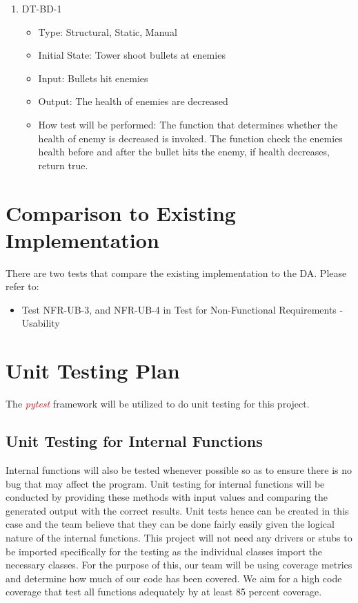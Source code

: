 \documentclass[12,english]{article}
\begin{document}
\begin{enumerate}
    \item DT-BD-1
    \begin{itemize}
        \item Type: Structural, Static, Manual
        \item Initial State: Tower shoot bullets at enemies
        \item Input: Bullets hit enemies
        \item Output: The health of enemies are decreased
        \item How test will be performed: The function that determines whether the health of enemy is decreased is invoked. The function check the enemies health before and after the bullet hits the enemy, if health decreases, return true.
    \end{itemize}
\end{enumerate}

\section{Comparison to Existing Implementation}
There are two tests that compare the existing implementation to the DA. Please refer to:
\begin{itemize}
    \item Test NFR-UB-3, and NFR-UB-4 in Test for Non-Functional Requirements - Usability
\end{itemize}

\section{Unit Testing Plan}
The \textcolor{red}{\textit{pytest}} framework will be utilized to do unit testing for this project.
\subsection{Unit Testing for Internal Functions}
Internal functions will also be tested whenever possible so as to ensure there is no bug that may affect the program. Unit testing for internal functions will be conducted by providing these methods with input values and comparing the generated output with the correct results. Unit tests hence can be created in this case and the team believe that they can be done fairly easily given the logical nature of the internal functions. This project will not need any drivers or stubs to be imported specifically for the testing as the individual classes import the necessary classes. For the purpose of this, our team will be using coverage metrics and determine how much of our code has been covered. We aim for a high code coverage that test all functions adequately by at least 85 percent coverage.
\end{document}
